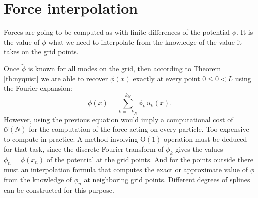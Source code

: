 \section{Force interpolation}

\noindent Forces are going to be computed as
with finite differences of the potential $\phi$.
It is the value of $\phi$ what we need to interpolate 
from the knowledge of the value it takes on 
the grid points.

Once $\tilde\phi$ is known for all modes on the grid,
then according to Theorem \ref{th:nyquist} 
we are able to recover $\phi(x)$ exactly 
at every point $0 \le 0 < L$ using the Fourier expansion:
\begin{equation}
    \phi(x) = \sum_{k=-k_N}^{k_N} \tilde \phi_k\, u_k(x).
\end{equation}
However, using the previous equation would imply a computational
cost of $\mathcal{O}(N)$ for the computation of the force
acting on every particle. Too expensive to compute in practice.
A method involving $\mathrm{O}(1)$ operation must be deduced
for that task, since the discrete Fourier transform 
of $\tilde\phi_k$ gives the values $\phi_n = \phi(x_n)$
of the potential at the grid points.
And for the points outside there must an interpolation
formula that computes the exact or approximate value
of $\phi$ from the knowledge of $\phi_n$ at neighboring grid points.
Different degrees of splines can be constructed for this
purpose.

